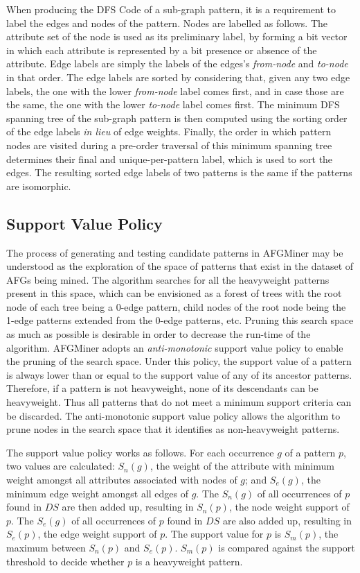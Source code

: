 When producing the DFS Code of a sub-graph pattern, it is a requirement to label the edges and nodes of the pattern. Nodes are labelled as follows. The attribute set of the node is used as its preliminary label, by forming a bit vector in which each attribute is represented by a bit presence or absence of the attribute. Edge labels are simply the labels of the edges's \emph{from-node} and \emph{to-node} in that order. The edge labels are sorted by considering that, given any two edge labels, the one with the lower \emph{from-node} label comes first, and in case those are the same, the one with the lower \emph{to-node} label comes first. The minimum DFS spanning tree of the sub-graph pattern is then computed using the sorting order of the edge labels \emph{in lieu} of edge weights. Finally, the order in which pattern nodes are visited during a pre-order traversal of this minimum spanning tree determines their final and unique-per-pattern label, which is used to sort the edges. The resulting sorted edge labels of two patterns is the same if the patterns are isomorphic.

\subsection{Support Value Policy}
The process of generating and testing candidate patterns in AFGMiner may be understood as the exploration of the space of patterns that exist in the dataset of AFGs being mined. The algorithm searches for all the heavyweight patterns present in this space, which can be envisioned as a forest of trees with the root node of each tree being a 0-edge pattern, child nodes of the root node being the 1-edge patterns extended from the 0-edge patterns, etc. Pruning this search space as much as possible is desirable in order to decrease the run-time of the algorithm. AFGMiner adopts an \emph{anti-monotonic} support value policy to enable the pruning of the search space. Under this policy, the support value of a pattern is always lower than or equal to the support value of any of its ancestor patterns. Therefore, if a pattern is not heavyweight, none of its descendants can be heavyweight. Thus all patterns that do not meet a minimum support criteria can be discarded. The anti-monotonic support value policy allows the algorithm to prune  nodes in the search space that it identifies as non-heavyweight patterns. 

The support value policy works as follows. For each occurrence $g$ of a pattern $p$, two values are calculated: $S_n(g)$, the weight of the attribute with minimum weight amongst all attributes associated with nodes of $g$; and $S_e(g)$, the minimum edge weight amongst all edges of $g$. The $S_n(g)$ of all occurrences of $p$ found in $DS$ are then added up, resulting in $S_n(p)$, the node weight support of $p$. The $S_e(g)$ of all occurrences of $p$ found in $DS$ are also added up, resulting in $S_e(p)$, the edge weight support of $p$. The support value for $p$ is $S_m(p)$, the maximum between $S_n(p)$ and $S_e(p)$. $S_m(p)$ is compared against the support threshold to decide whether $p$ is a heavyweight pattern. 


